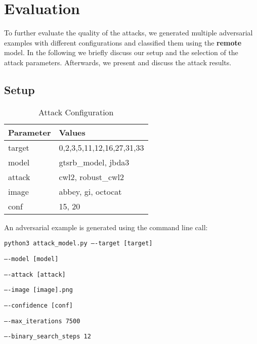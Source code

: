
\section{Evaluation}

To further evaluate the quality of the attacks, we generated multiple adversarial examples with different configurations and classified them using the \textbf{remote} model. In the following we briefly discuss our setup and the selection of the attack parameters. Afterwards, we present and discuss the attack results.

\subsection{Setup}

\begin{table}
\begin{tabular}{l | l}
\textbf{Parameter} & \textbf{Values} \\\hline

target & 0,2,3,5,11,12,16,27,31,33 \\\hline

model & gtsrb\_model, jbda3\\\hline

attack & cwl2, robust\_cwl2\\\hline

image & abbey, gi, octocat\\\hline

conf & 15, 20
\end{tabular}
\caption{Attack Configuration}
\label{tab:cli_params}
\end{table}

\begin{minipage}{\linewidth}
An adversarial example is generated using the command line call:

\vspace{2ex}
\texttt{python3 attack\_model.py ----target [target]}

\hspace{4cm}\texttt{----model [model]}

\hspace{4cm}\texttt{----attack [attack]}

\hspace{4cm}\texttt{----image [image].png}

\hspace{4cm}\texttt{----confidence [conf]}

\hspace{4cm}\texttt{----max\_iterations 7500}

\hspace{4cm}\texttt{----binary\_search\_steps 12}
\vspace{2ex}
\end{minipage}

